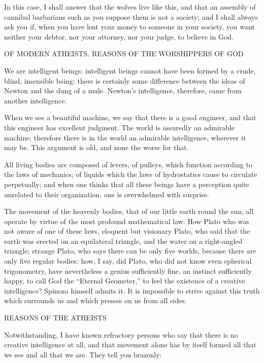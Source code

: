 In this case, I shall answer that the wolves live like this, and that an
assembly of cannibal barbarians such as you suppose them is not a
society; and I shall always ask you if, when you have lent your money to
someone in your society, you want neither your debtor, nor your
attorney, nor your judge, to believe in God.


OF MODERN ATHEISTS. REASONS OF THE WORSHIPPERS OF GOD

We are intelligent beings: intelligent beings cannot have been formed by
a crude, blind, insensible being: there is certainly some difference
between the ideas of Newton and the dung of a mule. Newton's
intelligence, therefore, came from another intelligence.

When we see a beautiful machine, we say that there is a good engineer,
and that this engineer has excellent judgment. The world is assuredly an
admirable machine; therefore there is in the world an admirable
intelligence, wherever it may be. This argument is old, and none the
worse for that.

All living bodies are composed of levers, of pulleys, which function
according to the laws of mechanics; of liquids which the laws of
hydrostatics cause to circulate perpetually; and when one thinks that
all these beings have a perception quite unrelated to their
organization, one is overwhelmed with surprise.

The movement of the heavenly bodies, that of our little earth round the
sun, all operate by virtue of the most profound mathematical law. How
Plato who was not aware of one of these laws, eloquent but visionary
Plato, who said that the earth was erected on an equilateral triangle,
and the water on a right-angled triangle; strange Plato, who says there
can be only five worlds, because there are only five regular bodies:
how, I say, did Plato, who did not know even spherical trigonometry,
have nevertheless a genius sufficiently fine, an instinct sufficiently
happy, to call God the \enquote{Eternal Geometer,} to feel the existence of a
creative intelligence? Spinoza himself admits it. It is impossible to
strive against this truth which surrounds us and which presses on us
from all sides.

\noindent
REASONS OF THE ATHEISTS

Notwithstanding, I have known refractory persons who say that there is
no creative intelligence at all, and that movement alone has by itself
formed all that we see and all that we are. They tell you brazenly:


